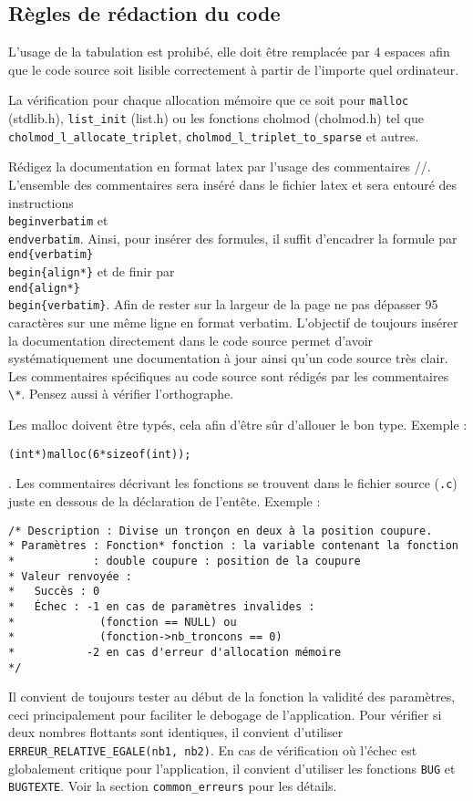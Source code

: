 \documentclass{article}
\begin{document}
\subsection{Règles de rédaction du code}
L'usage de la tabulation est prohibé, elle doit être remplacée par 4 espaces afin que le code source soit lisible correctement à partir de l'importe quel ordinateur.\par
La vérification pour chaque allocation mémoire que ce soit pour \texttt{malloc} (stdlib.h), \texttt{list\_init} (list.h) ou les fonctions cholmod (cholmod.h) tel que \texttt{cholmod\-\_l\-\_allocate\-\_triplet}, \texttt{cholmod\-\_l\-\_triplet\-\_to\-\_sparse} et autres.\par
Rédigez la documentation en format latex par l'usage des commentaires //. L'ensemble des commentaires sera inséré dans le fichier latex et sera entouré des instructions \texttt{\\begin{verbatim}} et \texttt{\\end{verbatim}}.
Ainsi, pour insérer des formules, il suffit d'encadrer la formule par \texttt{\\end\{verbatim\}} \texttt{\\begin\{align*\}} et de finir par \texttt{\\end\{align*\}} \texttt{\\begin\{verbatim\}}.
Afin de rester sur la largeur de la page ne pas dépasser 95 caractères sur une même ligne en format verbatim. L'objectif de toujours insérer la documentation directement dans le code source permet d'avoir systématiquement une documentation à jour ainsi qu'un code source très clair.
Les commentaires spécifiques au code source sont rédigés par les commentaires \verb+\*+. Pensez aussi à vérifier l'orthographe.\par
Les malloc doivent être typés, cela afin d'être sûr d'allouer le bon type. Exemple : \begin{center}\texttt{(int*)malloc(6*sizeof(int));}\end{center}.
Les commentaires décrivant les fonctions se trouvent dans le fichier source (\texttt{.c}) juste en dessous de la déclaration de l'entête. Exemple :
\begin{verbatim}
/* Description : Divise un tronçon en deux à la position coupure.
* Paramètres : Fonction* fonction : la variable contenant la fonction
*            : double coupure : position de la coupure
* Valeur renvoyée :
*   Succès : 0
*   Échec : -1 en cas de paramètres invalides :
*             (fonction == NULL) ou
*             (fonction->nb_troncons == 0)
*           -2 en cas d'erreur d'allocation mémoire
*/
\end{verbatim}
Il convient de toujours tester au début de la fonction la validité des paramètres, ceci principalement pour faciliter le debogage de l'application.
Pour vérifier si deux nombres flottants sont identiques, il convient d'utiliser \texttt{ERREUR\_RELATIVE\_EGALE(nb1, nb2)}.
En cas de vérification où l'échec est globalement critique pour l'application, il convient d'utiliser les fonctions \texttt{BUG} et \texttt{BUGTEXTE}. Voir la section \texttt{common\_erreurs} pour les détails.
\end{document}
